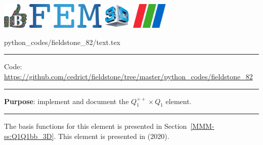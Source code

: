 \noindent
\includegraphics[height=1.25cm]{images/pictograms/benchmark}
\includegraphics[height=1.25cm]{images/pictograms/FEM}
\includegraphics[height=1.25cm]{images/pictograms/3d}
\includegraphics[height=1.25cm]{images/pictograms/paraview}


\begin{flushright} {\tiny {\color{gray} python\_codes/fieldstone\_82/text.tex}} \end{flushright}



\par\noindent\rule{\textwidth}{0.4pt}

\begin{center}
\inpython
{\small Code: \url{https://github.com/cedrict/fieldstone/tree/master/python_codes/fieldstone_82}}
\end{center}

\par\noindent\rule{\textwidth}{0.4pt}

{\bf \color{teal} Purpose}: implement and document the $Q_1^{++}\times Q_1$ element.


\par\noindent\rule{\textwidth}{0.4pt}

The basis functions for this element is presented in Section~\ref{MMM-ss:Q1Q1bb_3D}.
This element is presented in \textcite{kahp20} (2020). 

